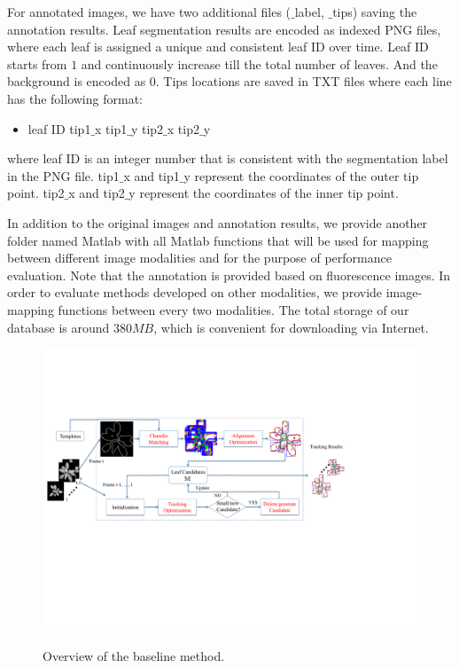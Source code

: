 For annotated images, we have two additional files ($\_$label, $\_$tips) saving the annotation results.
Leaf segmentation results are encoded as indexed PNG files, where each leaf is assigned a unique and consistent leaf ID over time.
Leaf ID starts from $1$ and continuously increase till the total number of leaves.
And the background is encoded as $0$.
Tips locations are saved in TXT files where each line has the following format:
\begin{itemize}
\item leaf ID \quad tip1$\_$x \quad tip1$\_$y \quad tip2$\_$x \quad tip2$\_$y
\end{itemize}
where leaf ID is an integer number that is consistent with the segmentation label in the PNG file.
tip1$\_$x and tip1$\_$y represent the coordinates of the outer tip point.
tip2$\_$x and tip2$\_$y represent the coordinates of the inner tip point.


In addition to the original images and annotation results, we provide another folder named Matlab with all Matlab functions that will be used for mapping between different image modalities and for the purpose of performance evaluation.
Note that the annotation is provided based on fluorescence images.
In order to evaluate methods developed on other modalities, we provide image-mapping functions between every two modalities.
The total storage of our database is around $380 MB$, which is convenient for downloading via Internet.

\begin{figure}[t!]
\centering
\includegraphics[width=.98\textwidth]{Figures/overview}\\
\caption{Overview of the baseline method.}
\label{fig:methodOverview}
\end{figure}

